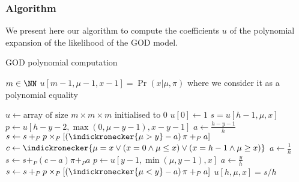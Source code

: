 \subsubsection{Algorithm}

We present here our algorithm to compute the coefficients $u$ of the polynomial expansion of the likelihood of the GOD model. 


\begin{algorithm}[H]
    \caption{GOD polynomial computation}
    \begin{algorithmic}[1]
    \Require $m \in \NN$
    \Ensure $u[m -1, \mu - 1, x - 1] = \Pr(x | \mu, \pi)$ where we consider it as a polynomial equality  
        
    \State $u \leftarrow \text{array of size } m \times m \times m$ initialised to $0$
    \State $u[0] \leftarrow 1$
                \State $s = u[h - 1, \mu, x]$
                    \State $p \leftarrow u[h - y - 2, \max(0, \mu - y - 1), x - y - 1]$
                    \State $a \leftarrow \frac{h - y - 1}{h}$
                    \State $s \leftarrow s +_P p \times_P \left[ \left( \indickronecker{\mu > y} - a \right) \pi +_P a \right]$
                \EndFor
                \State $c \leftarrow \indickronecker{\mu = x \lor (x = 0 \land \mu \leq x) \lor (x = h - 1 \land \mu \geq x)}$
                \State $a \leftarrow \frac{1}{h}$
                \State $s \leftarrow s +_P (c - a) \pi +_P a$
                    \State $p \leftarrow u[y - 1, \min(\mu, y - 1), x]$
                    \State $a \leftarrow \frac{y}{h}$
                    \State $s \leftarrow s +_P p \times_P \left[ \left( \indickronecker{\mu < y} - a \right) \pi +_P  a \right]$
                \EndFor
                \State $u[h, \mu, x] = s / h$
            \EndFor
        \EndFor
    \EndFor    
\end{algorithmic}
\end{algorithm}